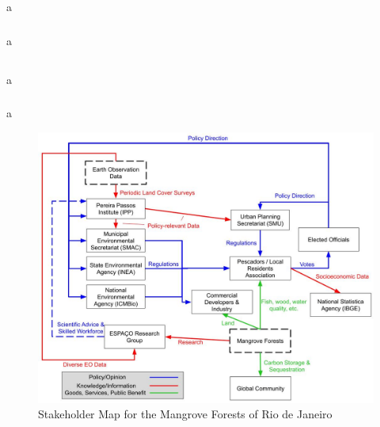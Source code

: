 \chapter{} \label{ch:mangroves}



\section{}

a

\subsection{}

a

\section{}

a

\subsection{}

a

\begin{figure}[h]
	\centering
	\includegraphics[scale=0.3]{Figures/chap4/Stakeholder_Map_v2.jpg}
	\caption[Stakeholder Map for the Mangrove Forests of Rio de Janeiro]{Stakeholder Map for the Mangrove Forests of Rio de Janeiro}
	\label{fig:rio_stakemap}
\end{figure}

